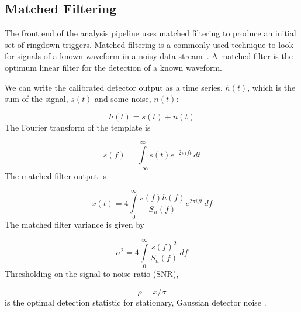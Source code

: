 \subsection{Matched Filtering}

The front end of the analysis pipeline uses matched filtering to produce an initial
set of ringdown triggers. Matched filtering is a commonly used technique to look
for signals of a known waveform in a noisy data stream~\cite{Bruce:MF}. A
matched filter is the optimum linear filter for the detection of a known
waveform.

We can write the calibrated detector output as a time series, $h(t)$, which is 
the sum of the signal, $s(t)$ and some noise, $n(t)$:

\begin{equation}
h(t) = s(t) + n(t)
\end{equation}
The Fourier transform of the template is

\begin{equation}
s(f) = \int\limits_{-\infty}^{\infty} s(t) e^{-2 \pi i f t} \, dt
\end{equation}
The matched filter output is

\begin{equation}
x(t) = 4 \int\limits_{0}^{\infty} \frac{s(f) h(f)}{S_n(f)} e^{2 \pi i f t} \, df
\label{eq:MF}
\end{equation}
The matched filter variance is given by

\begin{equation}
\sigma^2 = 4 \int\limits_{0}^{\infty} \frac{s(f)^2}{S_n(f)}\, df
\end{equation}
Thresholding on the signal-to-noise ratio (SNR),

\begin{equation}
\rho = x/\sigma
\end{equation}
is the optimal detection statistic for stationary, Gaussian
detector noise \cite{Jolien:40m}.

